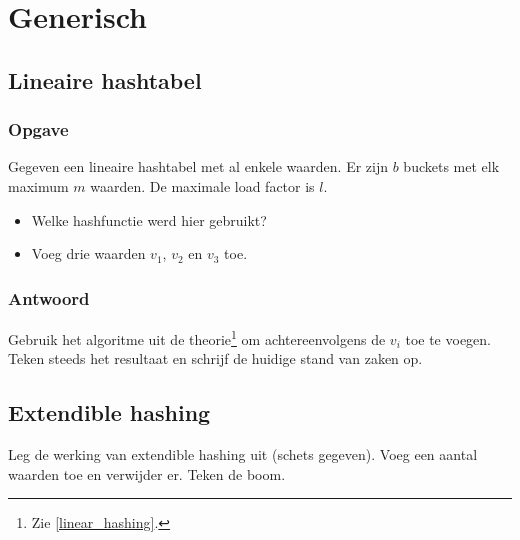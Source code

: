 \documentclass[hashing.tex]{subfiles}
\begin{document}
\chapter{Generisch}
\renewcommand\thesection{V\arabic{section}}
\renewcommand\thesubsection{V\arabic{section}}

\section{Lineaire hashtabel}
\subsection*{Opgave}
Gegeven een lineaire hashtabel met al enkele waarden. Er zijn $b$ buckets met elk maximum $m$ waarden. De maximale load factor is $l$.
\begin{itemize}
\item Welke hashfunctie werd hier gebruikt?
\item Voeg drie waarden $v_1$, $v_2$ en $v_3$ toe.
\end{itemize}
\subsection*{Antwoord}
Gebruik het algoritme uit de theorie\footnote{Zie \ref{linear_hashing}.} om achtereenvolgens de $v_i$ toe te voegen. Teken steeds het resultaat en schrijf de huidige stand van zaken op.

\section{Extendible hashing}
Leg de werking van extendible hashing uit (schets gegeven). Voeg een aantal waarden toe en verwijder er. Teken de boom.
\end{document}
